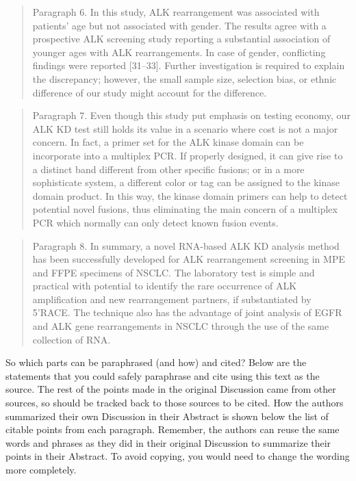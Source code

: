 \documentclass[
]{book}
\begin{document}
\begin{quote}
Paragraph 6. In this study, ALK rearrangement was associated with patients' age but not associated with gender. The results agree with a prospective ALK screening study reporting a substantial association of younger ages with ALK rearrangements. In case of gender, conflicting findings were reported {[}31--33{]}. Further investigation is required to explain the discrepancy; however, the small sample size, selection bias, or ethnic difference of our study might account for the difference.
\end{quote}

\begin{quote}
Paragraph 7. Even though this study put emphasis on testing economy, our ALK KD test still holds its value in a scenario where cost is not a major concern. In fact, a primer set for the ALK kinase domain can be incorporate into a multiplex PCR. If properly designed, it can give rise to a distinct band different from other specific fusions; or in a more sophisticate system, a different color or tag can be assigned to the kinase domain product. In this way, the kinase domain primers can help to detect potential novel fusions, thus eliminating the main concern of a multiplex PCR which normally can only detect known fusion events.
\end{quote}

\begin{quote}
Paragraph 8. In summary, a novel RNA-based ALK KD analysis method has been successfully developed for ALK rearrangement screening in MPE and FFPE specimens of NSCLC. The laboratory test is simple and practical with potential to identify the rare occurrence of ALK amplification and new rearrangement partners, if substantiated by 5'RACE. The technique also has the advantage of joint analysis of EGFR and ALK gene rearrangements in NSCLC through the use of the same collection of RNA.
\end{quote}

So which parts can be paraphrased (and how) and cited? Below are the statements that you could safely paraphrase and cite using this text as the source. The rest of the points made in the original Discussion came from other sources, so should be tracked back to those sources to be cited. How the authors summarized their own Discussion in their Abstract is shown below the list of citable points from each paragraph. Remember, the authors can reuse the same words and phrases as they did in their original Discussion to summarize their points in their Abstract. To avoid copying, you would need to change the wording more completely.
\end{document}
